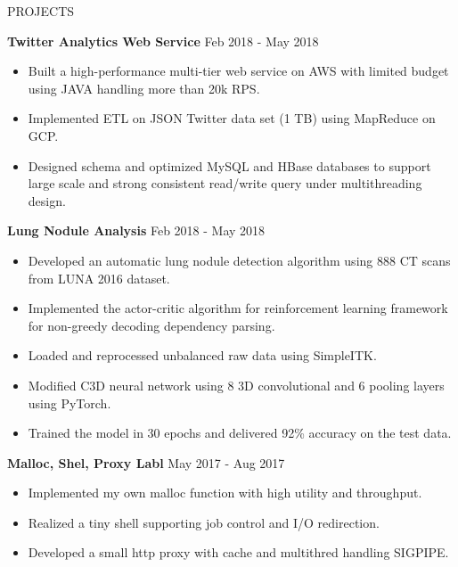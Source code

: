 \documentclass{res}
\begin{document}
\begin{resume}
\begin{section}{PROJECTS}
\vspace{-0.6em}

\textbf{Twitter Analytics Web Service} \hfill {Feb 2018 - May 2018}
\begin{itemize}[leftmargin=0.3in]
\item{Built a high-performance multi-tier web service on AWS with limited budget using JAVA handling more than 20k RPS.}
\vspace{-0.4em}
\item{Implemented ETL on JSON Twitter data set (1 TB) using MapReduce on GCP.}
\vspace{-0.4em}
\item{Designed schema and optimized MySQL and HBase databases to support large scale and strong consistent read/write query under multithreading design.}
\end{itemize}

\vspace{-0.6em}

\textbf{Lung Nodule Analysis} \hfill {Feb 2018 - May 2018}
\begin{itemize}[leftmargin=0.3in]
\item{Developed an automatic lung nodule detection algorithm using 888 CT scans from LUNA 2016 dataset.}
\vspace{-0.4em}
\item{Implemented the actor-critic algorithm for reinforcement learning framework for non-greedy decoding dependency parsing.}
\vspace{-0.4em}
\item{Loaded and reprocessed unbalanced raw data using SimpleITK.}
\vspace{-0.4em}
\item{Modified C3D neural network using 8 3D convolutional and 6 pooling layers using PyTorch.}
\vspace{-0.4em}
\item{Trained the model in 30 epochs and delivered 92\% accuracy on the test data.}
\end{itemize}

\vspace{-0.6em}

\textbf{Malloc, Shel, Proxy Labl} \hfill {May 2017 - Aug 2017}
\begin{itemize}[leftmargin=0.3in]
\item{Implemented my own malloc function with high utility and throughput.}
\vspace{-0.4em}
\item{Realized a tiny shell supporting job control and I/O redirection.}
\vspace{-0.4em}
\item{Developed a small http proxy with cache and multithred handling SIGPIPE.}
\end{itemize}


\end{section}
\end{resume}
\end{document}
